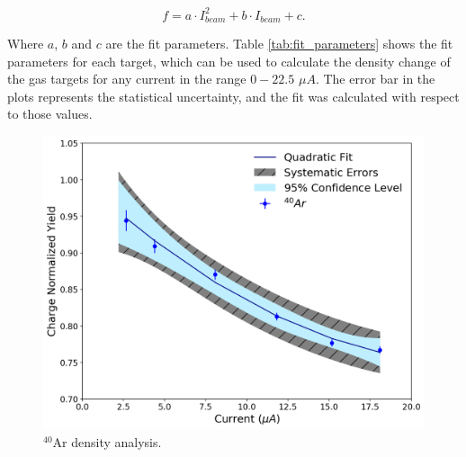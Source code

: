 \documentclass[final,5p,times,twocolumn]{elsarticle}
\begin{document}
\begin{equation}
f = a\cdot I_{beam}^{2} + b \cdot I_{beam} + c.
\label{eq:boiling_factor}
\end{equation}

\noindent Where $a$, $b$ and $c$ are the fit parameters. Table \ref{tab:fit_parameters} shows the fit parameters for each target, which can be used to calculate the density change of the gas targets for any current in the range $0-22.5$ $\mu A$. The error bar in the plots represents the statistical uncertainty, and the fit was calculated with respect to those values.

\begin{figure}[!h]
	\centering
	\includegraphics[width=\linewidth]{images/argon_data.pdf}
	\caption{$^{40}$Ar density analysis.}
	\label{fig:argon_data}
\end{figure}
\end{document}
